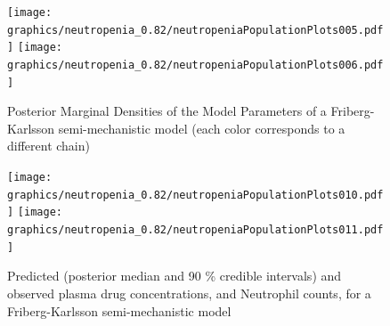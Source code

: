 \documentclass[11pt, reqno, oneside]{amsbook}
\numberwithin{equation}{chapter}
\numberwithin{figure}{chapter}
\numberwithin{table}{chapter}
\theoremstyle{remark}
\begin{document}
\begin{figure}[htbp]
\texttt{[image: graphics/neutropenia\_0.82/neutropeniaPopulationPlots005.pdf]}
\texttt{[image: graphics/neutropenia\_0.82/neutropeniaPopulationPlots006.pdf]}
\caption{{Posterior Marginal Densities of the Model Parameters of a Friberg-Karlsson semi-mechanistic model (each color corresponds to a different chain)}}
\label{FKDens}
\end{figure}

\begin{figure}[htbp]
\texttt{[image: graphics/neutropenia\_0.82/neutropeniaPopulationPlots010.pdf]}
\texttt{[image: graphics/neutropenia\_0.82/neutropeniaPopulationPlots011.pdf]}
\caption{{Predicted (posterior median and 90 \% credible intervals) and observed plasma drug concentrations, and Neutrophil counts, for a Friberg-Karlsson semi-mechanistic model}}
\label{FKPredictions}
\end{figure}

\appendix
\printindex
\backmatter



\end{document}
